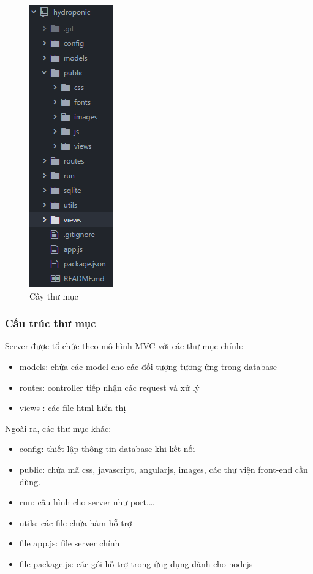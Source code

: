\documentclass[a4paper,12pt,oneside]{article}
\begin{document}
\begin{center}
\begin{figure}[htp]
\begin{center}
\includegraphics[scale=1.]{hinh/folder.png}
\end{center}
\caption{Cây thư mục}
\end{figure}
\end{center}
\subsubsection{Cấu trúc thư mục}

Server được tổ chức theo mô hình MVC với các thư mục chính:
\begin{itemize}
\item models: chứa các model cho các đối tượng tương ứng trong database
\item routes: controller tiếp nhận các request và xử lý
\item views : các file html hiển thị
\end{itemize}

Ngoài ra, các thư mục khác:
\begin{itemize}
\item config: thiết lập thông tin database khi kết nối
\item public: chứa mã css, javascript, angularjs, images, các thư viện front-end cần dùng.
\item run: cấu hình cho server như port,…
\item utils: các file chứa hàm hỗ trợ
\item file app.js: file server chính
\item file package.js: các gói hỗ trợ trong ứng dụng dành cho nodejs
\end{itemize}
\end{document}
